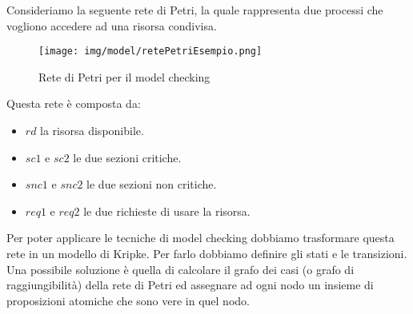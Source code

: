 \begin{esempio}
    Consideriamo la seguente rete di Petri, la quale rappresenta due processi che
    vogliono accedere ad una risorsa condivisa.
    \begin{figure}
        \centering
        \texttt{[image: img/model/retePetriEsempio.png]}
        \caption{Rete di Petri per il model checking}
    \end{figure}
    Questa rete è composta da:
    \begin{itemize}
        \item $rd$ la risorsa disponibile.
        \item $sc1$ e $sc2$ le due sezioni critiche.
        \item $snc1$ e $snc2$ le due sezioni non critiche.
        \item $req1$ e $req2$ le due richieste di usare la risorsa.
    \end{itemize}
    Per poter applicare le tecniche di model checking dobbiamo trasformare questa
    rete in un modello di Kripke. Per farlo dobbiamo definire gli stati e le
    transizioni. Una possibile soluzione è quella di calcolare il grafo dei casi
    (o grafo di raggiungibilità) della rete di Petri ed assegnare ad ogni nodo
    un insieme di proposizioni atomiche che sono vere in quel nodo.


\end{esempio}
